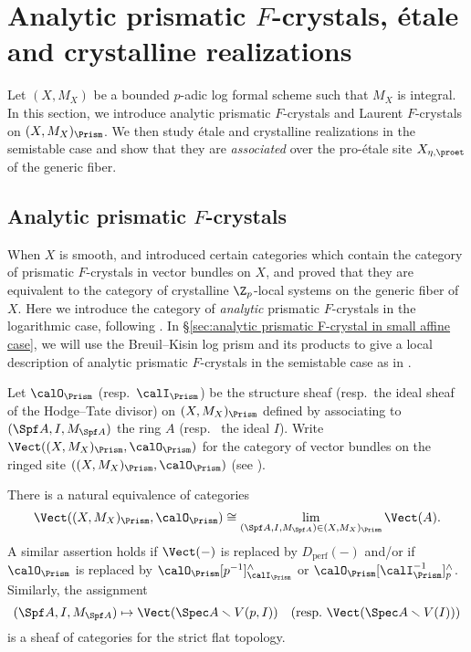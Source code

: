 \section{Analytic prismatic \texorpdfstring{$F$}{F}-crystals, \'etale and crystalline realizations} \label{sec:prismatic-F-crystal-etale-crystalline-realization}

Let $(X, M_X)$ be a bounded $p$-adic log formal scheme such that $M_X$ is integral. 
In this section, we introduce analytic prismatic $F$-crystals and Laurent $F$-crystals on $(X,M_X)_\Prism$. We then study \'etale and crystalline realizations in the semistable case and show that they are \emph{associated} over the pro-\'etale site $X_{\eta,\proet}$ of the generic fiber. 

\subsection{Analytic prismatic \texorpdfstring{$F$}{F}-crystals} \label{sec:analytic-prismatic-F-crystals}

When $X$ is smooth, \cite{du-liu-moon-shimizu-completed-prismatic-F-crystal-loc-system} and \cite{GuoReinecke-Ccris} introduced certain categories which contain the category of prismatic $F$-crystals in vector bundles on $X$, and proved that they are equivalent to the category of crystalline $\Z_p$-local systems on the generic fiber of $X$. Here we introduce the category of \emph{analytic} prismatic $F$-crystals in the logarithmic case, following \cite{GuoReinecke-Ccris}. In \S\ref{sec:analytic prismatic F-crystal in small affine case}, we will use the Breuil--Kisin log prism and its products to give a local description of analytic prismatic $F$-crystals in the semistable case as in \cite{du-liu-moon-shimizu-completed-prismatic-F-crystal-loc-system}.

\begin{defn}
    Let $\calO_\Prism$ (resp.~$\calI_\Prism$) be the structure sheaf (resp.~the ideal sheaf of the Hodge--Tate divisor) on $(X,M_X)_\Prism$ defined by associating to $(\Spf A,I,M_{\Spf A})$ the ring $A$ (resp.~ the ideal $I$). Write $\Vect((X,M_X)_\Prism,\calO_\Prism)$ for the category of vector bundles on the ringed site $((X,M_X)_\Prism,\calO_\Prism)$ (see \cite[Notation~2.1]{bhatt-scholze-prismaticFcrystal}).
\end{defn}

\begin{prop}\label{prop:strict flat descent of vector bundles}
There is a natural equivalence of categories
\[
\Vect((X,M_X)_\Prism,\calO_\Prism)\cong \lim_{(\Spf A,I,M_{\Spf A})\in (X,M_X)_\Prism}\Vect(A).
\]
A similar assertion holds if $\Vect(-)$ is replaced by $D_\mathrm{perf}(-)$ and/or if $\calO_\Prism$ is replaced by $\calO_\Prism[p^{-1}]^\wedge_{\calI_\Prism}$ or $\calO_\Prism[\calI_\Prism^{-1}]^\wedge_p$.
Similarly, the assignment 
\[
(\Spf A,I,M_{\Spf A})\mapsto \Vect(\Spec A\smallsetminus V(p,I))\quad \text{(resp.~$\Vect(\Spec A\smallsetminus V(I))$)}
\]
is a sheaf of categories for the strict flat topology. 
\end{prop}

